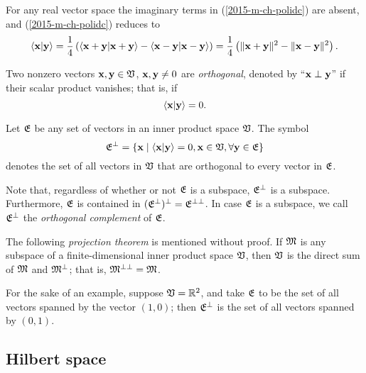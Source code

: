For any real vector space the imaginary terms in (\ref{2015-m-ch-polidc}) are absent, and (\ref{2015-m-ch-polidc}) reduces to
\begin{equation}
\langle {\bf x}\vert {\bf y}\rangle
=
\frac{1}{4}\left(
\langle {\bf x}+ {\bf y} \vert {\bf x}+ {\bf y}\rangle
-
\langle {\bf x}- {\bf y} \vert {\bf x}- {\bf y}\rangle
\right)
=
\frac{1}{4}\left(
\|  {\bf x}+ {\bf y} \|^2
-
\|  {\bf x}- {\bf y} \|^2
\right).
\label{2015-m-ch-polidr}
\end{equation}


Two nonzero vectors $  {\bf x} , {\bf y} \in {\frak V}$,  $  {\bf x},   {\bf y}\neq 0$
are {\em orthogonal}, denoted by ``${\bf x} \perp {\bf y}$''
if their scalar product vanishes; that is, if
\begin{equation}
\langle  {\bf x} \vert {\bf y} \rangle   = 0.
\end{equation}


Let ${\frak E}$ be any set of vectors in an inner product space ${\frak V}$.
The symbol
\begin{equation}
{\frak E}^\perp  = \left\{ {\bf x}\mid  \langle  {\bf x} \vert {\bf y} \rangle=0,  {\bf x} \in {\frak V},
\forall {\bf y} \in {\frak E} \right\}
\end{equation}
 denotes the set of all vectors in  ${\frak V}$ that are
orthogonal to every vector in  ${\frak E}$.

Note that, regardless of whether or not ${\frak E}$ is a subspace,
${\frak E}^\perp$ is a subspace.
Furthermore,
${\frak E}$  is contained in $({\frak E}^\perp)^\perp= {\frak E}^{\perp\perp}$.
In case ${\frak E}$ is a subspace, we call ${\frak E}^\perp$
the {\em orthogonal complement}
of ${\frak E}$.

The following {\em projection theorem}
is mentioned without proof.
If ${\frak M}$ is any subspace of a finite-dimensional inner product space ${\frak V}$,
then ${\frak V}$ is the direct sum of ${\frak M}$ and ${\frak M}^\perp$;
that is, ${\frak M}^{\perp \perp}={\frak M}$.

{
\color{blue}
\bexample
For the sake of an example, suppose ${\frak V}={\Bbb R}^2$,
and take ${\frak E}$ to be the set of all vectors spanned by the vector $(1,0)$;
then ${\frak E}^\perp$ is the set of all vectors spanned by $(0,1)$.
\eexample
}


\subsection{Hilbert space}


